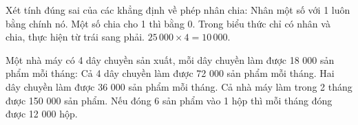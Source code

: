 \begin{ex} %
Xét tính đúng sai của các khẳng định về phép nhân chia:
\choiceTF
{\True Nhân một số với 1 luôn bằng chính nó.}
{Một số chia cho 1 thì bằng 0.}
{\True Trong biểu thức chỉ có nhân và chia, thực hiện từ trái sang phải.}
{$25\,000 \times 4 = 10\,000$.}
\end{ex}

\begin{ex} %
Một nhà máy có 4 dây chuyền sản xuất, mỗi dây chuyền làm được 18 000 sản phẩm mỗi tháng:
\choiceTF
{\True Cả 4 dây chuyền làm được 72 000 sản phẩm mỗi tháng.}
{\True Hai dây chuyền làm được 36 000 sản phẩm mỗi tháng.}
{Cả nhà máy làm trong 2 tháng được 150 000 sản phẩm.}
{\True Nếu đóng 6 sản phẩm vào 1 hộp thì mỗi tháng đóng được 12 000 hộp.}
\end{ex}

